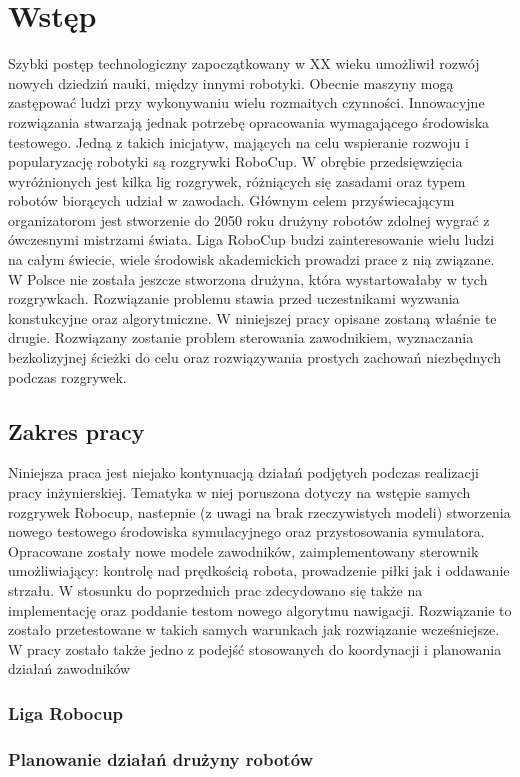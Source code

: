 \chapter[Wstęp ]{Wstęp}
Szybki postęp technologiczny zapoczątkowany w XX wieku umożliwił rozwój nowych dziedziń nauki, między innymi robotyki. Obecnie maszyny mogą zastępować ludzi przy wykonywaniu wielu rozmaitych czynności.
Innowacyjne rozwiązania stwarzają jednak potrzebę opracowania wymagającego środowiska testowego. Jedną z takich inicjatyw, mających na celu wspieranie rozwoju i popularyzację robotyki są rozgrywki
RoboCup. W obrębie przedsięwzięcia wyróżnionych jest kilka lig rozgrywek, różniących się zasadami oraz typem robotów biorących udział w zawodach.
Głównym celem przyświecającym organizatorom jest stworzenie do 2050 roku drużyny robotów zdolnej wygrać z ówczesnymi mistrzami świata.
Liga RoboCup budzi zainteresowanie wielu ludzi na całym świecie, wiele środowisk akademickich prowadzi prace z nią związane.
W Polsce nie została jeszcze stworzona drużyna, która wystartowałaby w tych rozgrywkach.
Rozwiązanie problemu stawia przed uczestnikami wyzwania konstukcyjne oraz algorytmiczne. W niniejszej pracy opisane zostaną właśnie te drugie. Rozwiązany zostanie problem sterowania zawodnikiem,
wyznaczania bezkolizyjnej ścieżki do celu oraz rozwiązywania prostych zachowań niezbędnych podczas rozgrywek.
\section{Zakres pracy}
Niniejsza praca jest niejako kontynuacją działań podjętych podczas realizacji pracy inżynierskiej. Tematyka w niej poruszona dotyczy na wstępie samych rozgrywek Robocup, nastepnie (z uwagi na brak 
rzeczywistych modeli) stworzenia nowego testowego środowiska symulacyjnego oraz przystosowania symulatora. Opracowane zostały nowe modele zawodników, zaimplementowany sterownik umożliwiający: kontrolę
 nad prędkością robota, prowadzenie piłki jak i oddawanie strzału.
 W stosunku do poprzednich prac zdecydowano się także na implementację oraz poddanie testom nowego algorytmu nawigacji. Rozwiązanie to zostało przetestowane w takich samych warunkach 
jak rozwiązanie wcześniejsze.
W pracy zostało także jedno z podejść stosowanych do koordynacji i planowania działań zawodników 
\subsection{Liga Robocup}
\subsection{Planowanie działań drużyny robotów}
